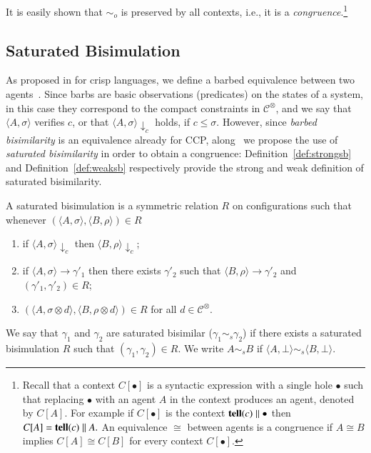 \documentclass[main.tex]{subfiles}
\begin{document}
It is easily shown that $ \sim_o$ is preserved by all contexts, i.e., it is a \emph{congruence}.\footnote{Recall that a context $C[\bullet]$ is a syntactic expression with a single hole $\bullet$ 
such that replacing $\bullet$ with an agent $A$ in the context produces an agent, denoted by $C[A]$. For example if $C[\bullet]$ is the context ${\bf tell}(c) \parallel \bullet$  then $C[A] =  {\bf tell}(c) \parallel A.$ An equivalence $\cong$ between agents is a congruence if $A \cong B$ implies $C[A] \cong C[B]$ for every context $C[\bullet].$}


\subsection{Saturated Bisimulation}
As proposed in \cite{pippo} for crisp languages, we define a barbed equivalence between two agents~\cite{barbed}.  Since barbs are basic observations (predicates) on the states of a system, in this case they correspond to the compact constraints in $\mathcal{C}^\otimes$, and we say that $\langle A, \sigma \rangle$ verifies $c$, or that $\langle A, \sigma \rangle \downarrow_c$ holds, if  $c \leq \sigma$.
%
However, since \emph{barbed bisimilarity} is an equivalence already for CCP, along~\cite{pippo}
we propose the use of \emph{saturated bisimilarity}
in order to obtain a congruence:
%
Definition~\ref{def:strongsb} and Definition~\ref{def:weaksb} respectively provide the strong and weak definition of saturated bisimilarity.

\begin{definition}\label{def:strongsb} A saturated bisimulation is a symmetric relation $R$ on configurations such that whenever
$( \langle A, \sigma \rangle,\langle B, \rho \rangle) \in R$
\begin{enumerate}
\item if $\langle A, \sigma \rangle \downarrow_c$ then $\langle B, \rho \rangle \downarrow_c$;
\item if $\langle A, \sigma \rangle \longrightarrow \gamma'_1$ then there exists $\gamma'_2$ such that $\langle B, \rho \rangle \longrightarrow \gamma'_2$ and $(\gamma'_1, \gamma'_2) \in R$;
\item $(\langle A,\sigma \otimes d\rangle, \langle B,\rho \otimes d \rangle) \in R$ for  all $d \in \mathcal{C}^\otimes$.
\end{enumerate}
We say that $\gamma_1$ and $\gamma_2$ are  saturated bisimilar ($\gamma_1  \sim_{\mathit{s}} \gamma_2$) if there exists a  saturated  bisimulation $R$ such that $(\gamma_1 , \gamma_2 ) \in R$. We write $A \sim_{\mathit{s}} B$ if $\langle A, \bot\rangle \sim_{\mathit{s}} \langle B, \bot \rangle$.
\end{definition}
\end{document}
